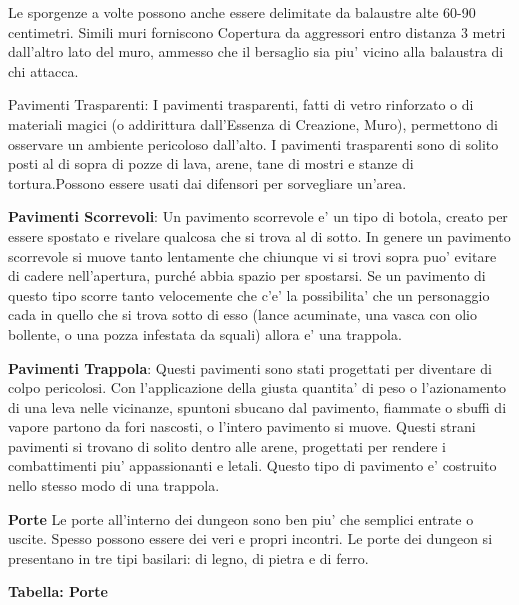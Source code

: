 \documentclass[a4paper,11pt,twoside,openany]{book}
\begin{document}
Le sporgenze a volte possono anche essere delimitate da balaustre alte 60-90 centimetri. Simili muri forniscono Copertura da aggressori entro distanza 3 metri dall'altro lato del muro, ammesso che il bersaglio sia piu' vicino alla balaustra di chi attacca.

Pavimenti Trasparenti: I pavimenti trasparenti, fatti di vetro rinforzato o di materiali magici (o addirittura dall'Essenza di Creazione, Muro), permettono di osservare un ambiente pericoloso dall'alto. I pavimenti trasparenti sono di solito posti al di sopra di pozze di lava, arene, tane di mostri e stanze di tortura.Possono essere usati dai difensori 
per sorvegliare un'area.

\textbf{Pavimenti Scorrevoli}: Un pavimento scorrevole e' un tipo di botola, creato per essere spostato e rivelare qualcosa che si trova al di sotto. In genere un pavimento scorrevole si muove tanto lentamente che chiunque vi si trovi sopra puo' evitare di cadere nell'apertura, purché abbia spazio per spostarsi. Se un pavimento di questo tipo scorre tanto velocemente che c'e' la possibilita' che un personaggio cada in quello che si trova sotto di esso (lance acuminate, una vasca con olio bollente, o una pozza infestata da squali) allora e' una trappola.

\textbf{Pavimenti Trappola}: Questi pavimenti sono stati progettati per diventare di colpo pericolosi. Con l'applicazione della giusta quantita' di peso o l'azionamento di una leva nelle vicinanze, spuntoni sbucano dal pavimento, fiammate o sbuffi di vapore partono da fori nascosti, o l'intero pavimento si muove. Questi strani pavimenti si trovano di solito dentro alle arene, progettati per rendere i combattimenti piu' appassionanti e letali. Questo tipo di pavimento e' costruito nello stesso modo di una trappola.

\textbf{Porte} Le porte all'interno dei dungeon sono ben piu' che semplici entrate o uscite. Spesso possono essere dei veri e propri incontri. Le porte dei dungeon si presentano in tre tipi basilari: di legno, di pietra e di ferro.

\bigskip

\textbf{Tabella: Porte}
\end{document}
